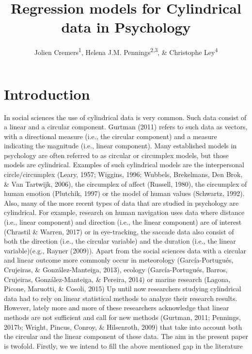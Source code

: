 \documentclass[man]{apa6}
\title{Regression models for Cylindrical data in Psychology}
\author{Jolien Cremers\textsuperscript{1}, Helena J.M.
Pennings\textsuperscript{2,3}, \& Christophe Ley\textsuperscript{4}}
\date{}
\affiliation{
\vspace{0.5cm}
\textsuperscript{1} Department of Methodology and Statistics, Utrecht University\\\textsuperscript{2} TNO\\\textsuperscript{3} Department of Education, Utrecht University\\\textsuperscript{4} Department of Applied Mathematics, Computer Science and Statistics, Ghent University}
\DeclareRobustCommand{\VAN}[3]{#2}
\DeclareRobustCommand{\DEN}[3]{#2}
\theoremstyle{definition}
\theoremstyle{definition}
\theoremstyle{definition}
\theoremstyle{remark}
\begin{document}
\maketitle

\section{Introduction}\label{Introduction}

In social sciences the use of cylindrical data is very common. Such data
consist of a linear and a circular component. Gurtman (2011) refers to
such data as vectors, with a directional measure (i.e., the circular
component) and a measure indicating the magnitude (i.e., linear
component). Many established models in psychology are often referred to
as circular or circumplex models, but those models are cylindrical.
Examples of such cylindrical models are the interpersonal
circle/circumplex (Leary, 1957; Wiggins, 1996; Wubbels, Brekelmans,
\DEN{Brok}{Den}{den} Brok, \& \VAN{Tartwijk}{Van}{van} Tartwijk, 2006),
the circumplex of affect (Russell, 1980), the circumplex of human
emotion (Plutchik, 1997) or the model of human values (Schwartz, 1992).
\newline \indent Also, many of the more recent types of data that are
studied in psychology are cylindrical. For example, research on human
navigation uses data where distance (i.e., linear component) and
direction (i.e., the linear component) are of interest (Chrastil \&
Warren, 2017) or in eye-tracking, the saccade data also consist of both
the direction (i.e., the circular variable) and the duration (i.e., the
linear variable)(e.g., Rayner (2009)). Apart from the social sciences
data with a circular and linear outcome more commonly occur in
meteorology (García-Portugués, Crujeiras, \& González-Manteiga, 2013),
ecology (García-Portugués, Barros, Crujeiras, González-Manteiga, \&
Pereira, 2014) or marine research (Lagona, Picone, Maruotti, \& Cosoli,
2015) \newline \indent Up until now researchers studying cylindrical
data had to rely on linear statistical methods to analyze their research
results. However, lately more and more of these researchers acknowledge
that linear methods are not sufficient and call for new methods
(Gurtman, 2011; Pennings, 2017b; Wright, Pincus, Conroy, \& Hilsenroth,
2009) that take into account both the circular and the linear component
of these data. \newline \indent The aim in the present paper is twofold.
Firstly, we we intend to fill the above mentioned gap in the literature
\end{document}
